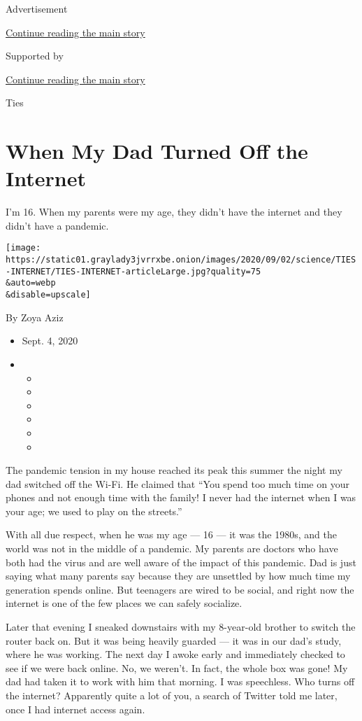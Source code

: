 Advertisement

\protect\hyperlink{after-top}{Continue reading the main story}

Supported by

\protect\hyperlink{after-sponsor}{Continue reading the main story}

Ties

\hypertarget{when-my-dad-turned-off-the-internet}{%
\section{When My Dad Turned Off the
Internet}\label{when-my-dad-turned-off-the-internet}}

I'm 16. When my parents were my age, they didn't have the internet and
they didn't have a pandemic.

\texttt{[image: https://static01.graylady3jvrrxbe.onion/images/2020/09/02/science/TIES-INTERNET/TIES-INTERNET-articleLarge.jpg?quality=75\\\&auto=webp\\\&disable=upscale]}

By Zoya Aziz

\begin{itemize}
\item
  Sept. 4, 2020
\item
  \begin{itemize}
  \item
  \item
  \item
  \item
  \item
  \item
  \end{itemize}
\end{itemize}

The pandemic tension in my house reached its peak this summer the night
my dad switched off the Wi-Fi. He claimed that ``You spend too much time
on your phones and not enough time with the family! I never had the
internet when I was your age; we used to play on the streets.''

With all due respect, when he was my age --- 16 --- it was the 1980s,
and the world was not in the middle of a pandemic. My parents are
doctors who have both had the virus and are well aware of the impact of
this pandemic. Dad is just saying what many parents say because they are
unsettled by how much time my generation spends online. But teenagers
are wired to be social, and right now the internet is one of the few
places we can safely socialize.

Later that evening I sneaked downstairs with my 8-year-old brother to
switch the router back on. But it was being heavily guarded --- it was
in our dad's study, where he was working. The next day I awoke early and
immediately checked to see if we were back online. No, we weren't. In
fact, the whole box was gone! My dad had taken it to work with him that
morning. I was speechless. Who turns off the internet? Apparently quite
a lot of you, a search of Twitter told me later, once I had internet
access again.

